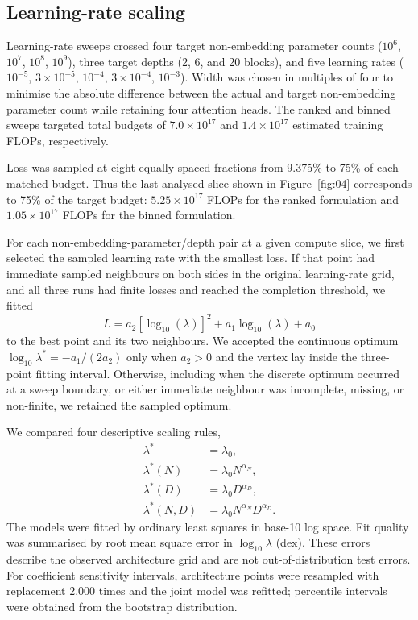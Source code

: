 \documentclass[pdflatex,sn-nature]{sn-jnl}%
\theoremstyle{thmstyleone}%
\theoremstyle{thmstyletwo}%
\theoremstyle{thmstylethree}%
\begin{document}
\subsection{Learning-rate scaling}

Learning-rate sweeps crossed four target non-embedding parameter counts (\(10^6\), \(10^7\), \(10^8\), \(10^9\)), three target depths (2, 6, and 20 blocks), and five learning rates (\(10^{-5}\), \(3\times10^{-5}\), \(10^{-4}\), \(3\times10^{-4}\), \(10^{-3}\)).
Width was chosen in multiples of four to minimise the absolute difference between the actual and target non-embedding parameter count while retaining four attention heads.
The ranked and binned sweeps targeted total budgets of \(7.0\times10^{17}\) and \(1.4\times10^{17}\) estimated training FLOPs, respectively.

Loss was sampled at eight equally spaced fractions from 9.375\% to 75\% of each matched budget.
Thus the last analysed slice shown in Figure~\ref{fig:04} corresponds to 75\% of the target budget: \(5.25\times10^{17}\) FLOPs for the ranked formulation and \(1.05\times10^{17}\) FLOPs for the binned formulation.

For each non-embedding-parameter/depth pair at a given compute slice, we first selected the sampled learning rate with the smallest loss.
If that point had immediate sampled neighbours on both sides in the original learning-rate grid, and all three runs had finite losses and reached the completion threshold, we fitted
\begin{equation}
    L = a_2{[\log_{10}(\lambda)]}^2+a_1\log_{10}(\lambda)+a_0
\end{equation}
to the best point and its two neighbours.
We accepted the continuous optimum \(\log_{10}\lambda^*=-a_1/(2a_2)\) only when \(a_2>0\) and the vertex lay inside the three-point fitting interval.
Otherwise, including when the discrete optimum occurred at a sweep boundary, or either immediate neighbour was incomplete, missing, or non-finite, we retained the sampled optimum.

We compared four descriptive scaling rules,
\begin{align}
    \lambda^* &= \lambda_0,\\
    \lambda^*(N) &= \lambda_0 N^{\alpha_N},\\
    \lambda^*(D) &= \lambda_0 D^{\alpha_D},\\
    \lambda^*(N,D) &= \lambda_0 N^{\alpha_N}D^{\alpha_D}.
\end{align}
The models were fitted by ordinary least squares in base-10 log space.
Fit quality was summarised by root mean square error in \(\log_{10}\lambda\) (dex).
These errors describe the observed architecture grid and are not out-of-distribution test errors.
For coefficient sensitivity intervals, architecture points were resampled with replacement 2,000 times and the joint model was refitted; percentile intervals were obtained from the bootstrap distribution.
\end{document}
